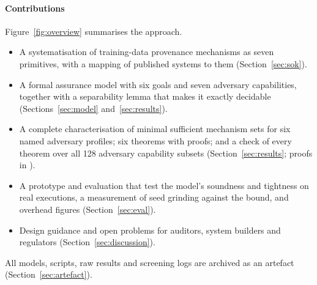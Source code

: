 \paragraph{Contributions}
Figure~\ref{fig:overview} summarises the approach.
\begin{itemize}
\item A systematisation of training-data provenance mechanisms as seven primitives, with a
  mapping of published systems to them (Section~\ref{sec:sok}).
\item A formal assurance model with six goals and seven adversary capabilities, together with
  a separability lemma that makes it exactly decidable (Sections~\ref{sec:model}
  and~\ref{sec:results}).
\item A complete characterisation of minimal sufficient mechanism sets for six named
  adversary profiles; six theorems with proofs; and a check of every theorem over all 128
  adversary capability subsets (Section~\ref{sec:results}; proofs in \proofsloc).
\item A prototype and evaluation that test the model's soundness and tightness on real
  executions, a measurement of seed grinding against the bound, and overhead figures
  (Section~\ref{sec:eval}).
\item Design guidance and open problems for auditors, system builders and regulators
  (Section~\ref{sec:discussion}).
\end{itemize}
All models, scripts, raw results and screening logs are archived as an artefact
(Section~\ref{sec:artefact}).
